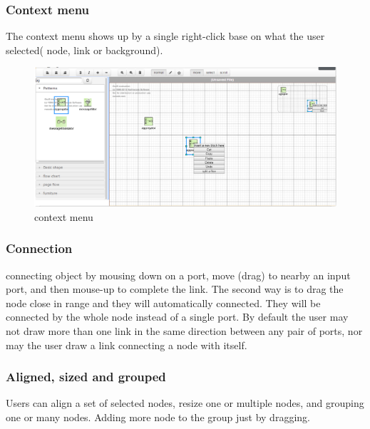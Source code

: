 \documentclass[14pt,a4paper]{extreport}
\begin{document}
			\subsubsection{Context menu}	
				The context menu shows up by a single right-click base on what the user selected( node, link or background).
			\begin{figure}[ht]
				\begin{center}
					\includegraphics[scale=0.5]{contextmenu.png}
					\caption{context menu}
					\label{contextmenu}
				\end{center}
			\end{figure}
			\subsubsection{Connection}
				connecting object by mousing down on a port, move (drag) to nearby an input port, and then mouse-up to complete the link. The second way is to drag the node close in range and they will automatically connected. They will be connected by the whole node instead of a single port. By default the user may not draw more than one link in the same direction between any pair of ports, nor may the user draw a link connecting a node with itself.
			\subsubsection{Aligned, sized and grouped}
			Users can align a set of selected nodes, resize one or multiple nodes, and grouping one or many nodes. Adding more node to the group just by dragging.
				
\end{document}
